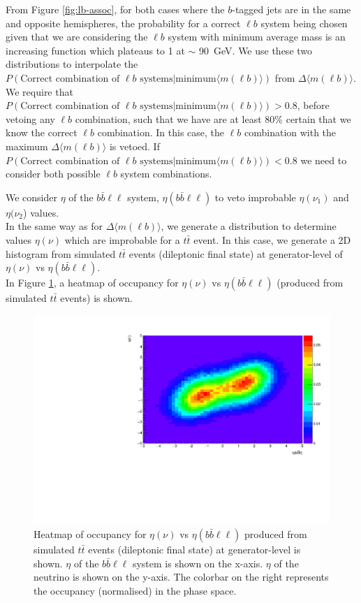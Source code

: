 From Figure \ref{fig:lb-assoc}, for both cases where the $b$-tagged jets are in the same and opposite hemispheres, the probability for a correct $\ell b$ system being chosen given that we are considering the $\ell b$ system with minimum average mass is an increasing function which plateaus to 1 at $\sim$ \SI{90}{\GeV}. We use these two distributions to interpolate the $P(\text{Correct combination of } \ell b \text{ systems} | \text{minimum} \langle m(\ell b) \rangle)$ from $\Delta \langle m(\ell b) \rangle$. We require that $P(\text{Correct combination of } \ell b \text{ systems} | \text{minimum} \langle m(\ell b) \rangle) > 0.8$, before vetoing any $\ell b$ combination, such that we have are at least 80$\%$ certain that we know the correct $\ell b$ combination. In this case, the $\ell b$ combination with the maximum $\Delta \langle m(\ell b) \rangle$ is vetoed. If $P(\text{Correct combination of } \ell b \text{ systems} | \text{minimum} \langle m(\ell b) \rangle) < 0.8$ we need to consider both possible $\ell b$ system combinations. 

\label{sec:eta-llbb-subsection}

We consider $\eta$ of the $b\bar{b}\ell\ell$ system, $\eta(b\bar{b}\ell\ell)$ to veto improbable $\eta(\nu_{1})$ and $\eta(\nu_{2}$) values.\\

In the same way as for $\Delta \langle m(\ell b)\rangle$, we generate a distribution to determine values $\eta(\nu)$ which are improbable for a $t\bar{t}$ event. In this case, we generate a 2D histogram from simulated $t\bar{t}$ events (dileptonic final state) at generator-level of $\eta (\nu)$ vs $\eta(b\bar{b}\ell\ell)$.\\

In Figure \ref{fig:eta-bbll-heatmap}, a heatmap of occupancy for $\eta (\nu)$ vs $\eta(b\bar{b}\ell\ell)$ (produced from simulated $t\bar{t}$ events) is shown. 

 \begin{figure}[h!]
	\includegraphics[width=0.6\linewidth]{figures/bbll_occ_2vSM.pdf}
	\centering
	\caption{Heatmap of occupancy for $\eta (\nu)$ vs $\eta(b\bar{b}\ell\ell)$ produced from simulated $t\bar{t}$ events (dileptonic final state) at generator-level is shown. $\eta$ of the $b\bar{b}\ell\ell$ system is shown on the x-axis. $\eta$ of the neutrino is shown on the y-axis. The colorbar on the right represents the occupancy (normalised) in the phase space.}
	\label{fig:eta-bbll-heatmap}
\end{figure}

